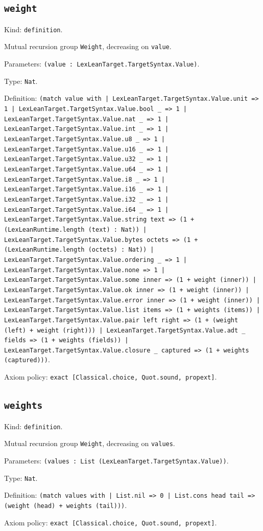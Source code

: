 \documentclass[11pt]{article}
\begin{document}
\subsection*{\texttt{weight}}
\noindent Kind: \texttt{definition}.\par
\noindent Mutual recursion group \texttt{Weight}, decreasing on \texttt{value}.\par
\noindent Parameters: \texttt{(value : LexLeanTarget.TargetSyntax.Value)}.\par
\noindent Type: \texttt{Nat}.\par
\noindent Definition: \texttt{(match value with | LexLeanTarget.TargetSyntax.Value.unit => 1 | LexLeanTarget.TargetSyntax.Value.bool \_ => 1 | LexLeanTarget.TargetSyntax.Value.nat \_ => 1 | LexLeanTarget.TargetSyntax.Value.int \_ => 1 | LexLeanTarget.TargetSyntax.Value.u8 \_ => 1 | LexLeanTarget.TargetSyntax.Value.u16 \_ => 1 | LexLeanTarget.TargetSyntax.Value.u32 \_ => 1 | LexLeanTarget.TargetSyntax.Value.u64 \_ => 1 | LexLeanTarget.TargetSyntax.Value.i8 \_ => 1 | LexLeanTarget.TargetSyntax.Value.i16 \_ => 1 | LexLeanTarget.TargetSyntax.Value.i32 \_ => 1 | LexLeanTarget.TargetSyntax.Value.i64 \_ => 1 | LexLeanTarget.TargetSyntax.Value.string text => (1 + (LexLeanRuntime.length (text) : Nat)) | LexLeanTarget.TargetSyntax.Value.bytes octets => (1 + (LexLeanRuntime.length (octets) : Nat)) | LexLeanTarget.TargetSyntax.Value.ordering \_ => 1 | LexLeanTarget.TargetSyntax.Value.none => 1 | LexLeanTarget.TargetSyntax.Value.some inner => (1 + weight (inner)) | LexLeanTarget.TargetSyntax.Value.ok inner => (1 + weight (inner)) | LexLeanTarget.TargetSyntax.Value.error inner => (1 + weight (inner)) | LexLeanTarget.TargetSyntax.Value.list items => (1 + weights (items)) | LexLeanTarget.TargetSyntax.Value.pair left right => (1 + (weight (left) + weight (right))) | LexLeanTarget.TargetSyntax.Value.adt \_ fields => (1 + weights (fields)) | LexLeanTarget.TargetSyntax.Value.closure \_ captured => (1 + weights (captured)))}.\par
\noindent Axiom policy: \texttt{exact [Classical.choice, Quot.sound, propext]}.\par
\subsection*{\texttt{weights}}
\noindent Kind: \texttt{definition}.\par
\noindent Mutual recursion group \texttt{Weight}, decreasing on \texttt{values}.\par
\noindent Parameters: \texttt{(values : List (LexLeanTarget.TargetSyntax.Value))}.\par
\noindent Type: \texttt{Nat}.\par
\noindent Definition: \texttt{(match values with | List.nil => 0 | List.cons head tail => (weight (head) + weights (tail)))}.\par
\noindent Axiom policy: \texttt{exact [Classical.choice, Quot.sound, propext]}.\par
\end{document}
